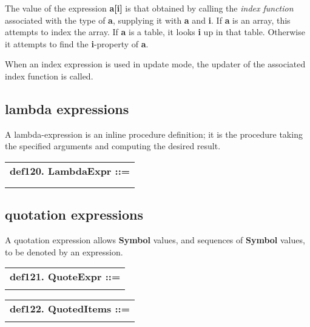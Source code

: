 \documentclass{report}
\begin{document}
The value of the expression {\bf a{[}i{]}} is that obtained by calling the
{\em index function} associated with the type of {\bf a}, supplying it with
{\bf a} and {\bf i}. If {\bf a} is an array, this attempts to index the array. If
{\bf a} is a table, it looks {\bf i} up in that table. Otherwise it attempts
to find the {\bf i}-property of {\bf a}.

When an index expression is used in update mode, the updater of the
associated index function is called.\subsection{lambda expressions}


A lambda-expression is an inline procedure definition; it is the
procedure taking the specified arguments and computing the desired
result.

\begin{tabular}{l}
{\bf def120. LambdaExpr ::= }\\ 
\hspace*{3mm}{\tt "(" Args "=$>$" StatementSeq ")"} \\ 
\hspace*{3mm}{\tt  $\mid$ "fun" Args "=$>$" StatementSeq "endfun"} \\ 
\end{tabular}

\subsection{quotation expressions}


A quotation expression allows {\bf Symbol} values, and sequences of {\bf Symbol}
values, to be denoted by an expression.

\begin{tabular}{l}
{\bf def121. QuoteExpr ::= }\\ 
\hspace*{3mm}{\tt "`" QuotedItems "`"} \\ 
\end{tabular}

\begin{tabular}{l}
{\bf def122. QuotedItems ::= }\\ 
\hspace*{3mm}{\tt QuotedItem*} \\ 
\end{tabular}
\end{document}
